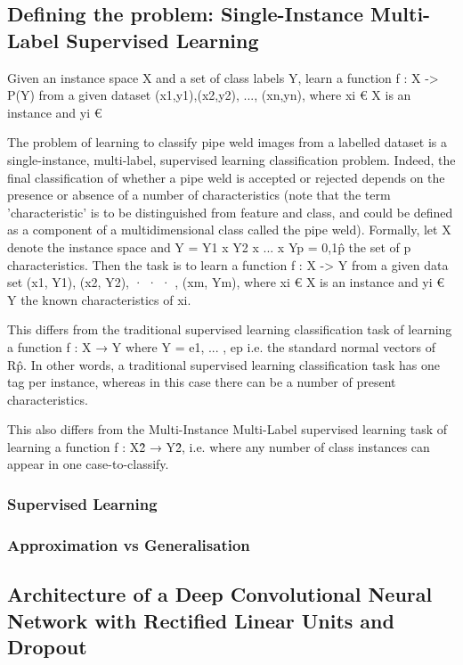 \documentclass[a4paper,11pt]{article}
\begin{document}
\subsection{Defining the problem: Single-Instance Multi-Label Supervised Learning}

Given an instance space X and a set of class labels Y, learn a function f : X -> P(Y) from a given dataset {(x1,y1),(x2,y2), ..., (xn,yn)}, where xi € X is an instance and yi € 

The problem of learning to classify pipe weld images from a labelled dataset is a single-instance, multi-label, supervised learning classification problem. Indeed, the final classification of whether a pipe weld is accepted or rejected depends on the presence or absence of a number of characteristics (note that the term 'characteristic' is to be distinguished from feature and class, and could be defined as a component of a multidimensional class called the pipe weld). Formally, let X denote the instance space and Y = Y1 x Y2 x ... x Yp = {0,1}\^p the set of p characteristics. Then the task is to learn a function f : X -> Y from a given data set {(x1, Y1), (x2, Y2), · · · , (xm, Ym)}, where xi € X is an instance and yi € Y the known characteristics of xi.

This differs from the traditional supervised learning classification task of learning a function f : X → Y where Y = {e1, ... , ep} i.e. the standard normal vectors of R\^p. In other words, a traditional supervised learning classification task has one tag per instance, whereas in this case there can be a number of present characteristics. 

This also differs from the Multi-Instance Multi-Label supervised learning task of learning a function f : X\^2 → Y\^2, i.e. where any number of class instances can appear in one case-to-classify. 



\subsubsection{Supervised Learning}

\subsubsection{Approximation vs Generalisation}


\subsection{Architecture of a Deep Convolutional Neural Network with Rectified Linear Units and Dropout}
\end{document}
